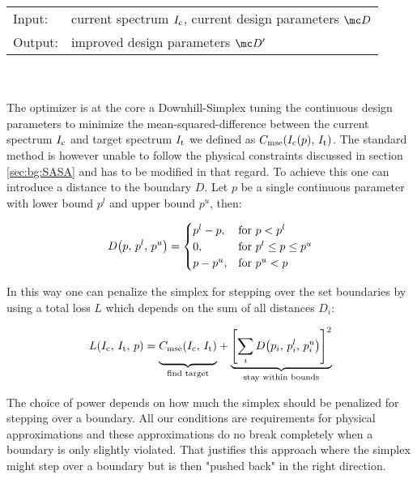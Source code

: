 \begin{tabular}{ll}
    \toprule
    Input: &
    current spectrum $I_{\mathrm{c}}$, 
    current design parameters $\mc D$\\
    Output: & 
    improved design parameters $\mc D'$\\
    \bottomrule
\end{tabular}
\\
\\
The optimizer is at the core a Downhill-Simplex \cite{Nelder1965} tuning the continuous design parameters to minimize the mean-squared-difference between the current spectrum $I_{\mathrm{c}}$ and target spectrum $I_{\mathrm{t}}$ we defined as 
$C_{\mathrm{mse}}\qty(I_{\mathrm{c}}(p), \, I_{\mathrm{t}})$.
The standard method is however unable to follow the physical constraints discussed in section \ref{sec:bg:SASA} and has to be modified in that regard. To achieve this one can introduce a distance to the boundary $D$. Let $p$ be a single continuous parameter with lower bound $p^l$ and upper bound $p^u$, then:

\begin{equation}
    D\qty(p, \, p^l, \, p^u) =
    \begin{cases}
        p^l - p, & \text{for } p < p^l\\
        0, & \text{for } p^l \leq p \leq p^u\\
        p - p^u, & \text{for } p^u < p
    \end{cases}
\end{equation}

\noindent
In this way one can penalize the simplex for stepping over the set boundaries by using a total loss $L$ which depends on the sum of all distances $D_i$:

\begin{equation}
    L(I_\s{c}, \,I_\s{t}, \,p) =
    {\underbrace{%
    \vphantom{ \left(\frac{a^{0.3}}{b}\right) }
    C_\s{mse}(I_\s{c}, \, I_\s{t})}_{\text{find target}}}
    +
    {\underbrace{%
    \qty[\sum_i D\qty(p_i, \, p_i^l, \, p_i^u)]^2
    }_{\text{stay within bounds}}}\\
\end{equation}

The choice of power depends on how much the simplex should be penalized for stepping over a boundary. All our conditions are requirements for physical approximations and these approximations do no break completely when a boundary is only slightly violated. That justifies this approach where the simplex might step over a boundary but is then "pushed back" in the right direction. 

